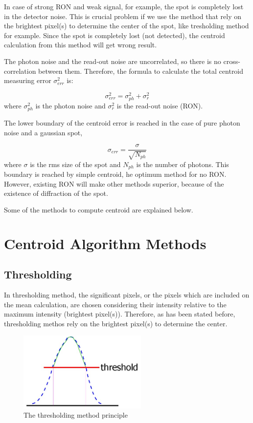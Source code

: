 \documentclass{article}
\begin{document}
In case of strong RON and weak signal, for example, the spot is completely lost in the detector noise. This is crucial problem if we use the method that rely on the brightest pixel(s) to determine the center of the spot, like tresholding method for example. Since the spot is completely lost (not detected), the centroid calculation from this method will get wrong result.

The photon noise and the read-out noise are uncorrelated, so there is no cross-correlation between them. Therefore, the formula to calculate the total centroid measuring error $\sigma_{err}^2$ is:

\begin{equation}
\sigma_{err}^2 =\sigma_{ph}^2+\sigma_r^2
\end{equation}
where $\sigma_{ph}^2$ is the photon noise and $\sigma_{r}^2$ is the read-out noise (RON). 

The lower boundary of the centroid error is reached in the case of pure photon noise and a gaussian spot,

\begin{equation}
\sigma_{err} = \frac{\sigma}{\sqrt{N_{ph}}}
\end{equation}
where $\sigma$ is the rms size of the spot and $N_{ph}$ is the number of photons. This boundary is reached by simple centroid, he optimum method for no RON. However, existing RON will make other methods superior, because of the existence of diffraction of the spot.

Some of the methods to compute centroid are explained below.

\section{Centroid Algorithm Methods}

\subsection{Thresholding}

In thresholding method, the significant pixels, or the pixels which are included on the mean calculation, are chosen considering their intensity relative to the maximum intensity (brightest pixel(s)). Therefore, as has been stated before, thresholding methos rely on the brightest pixel(s) to determine the center.

\begin{figure}[H]
    \centering
    \includegraphics[width=2.5in]{figures/threshold.jpg}
    \caption{The thresholding method principle}
    \label{fig:threshold}
\end{figure}
\end{document}
